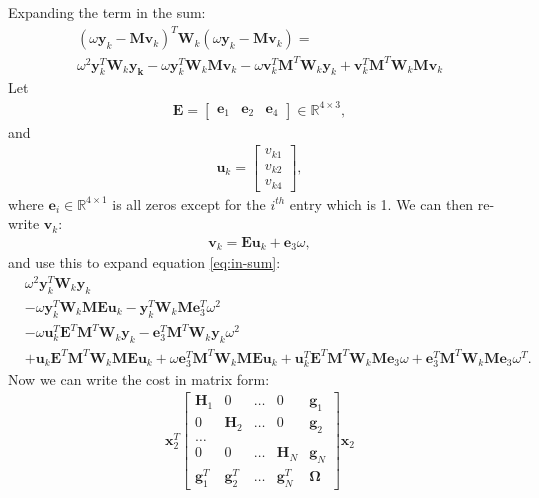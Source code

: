 \documentclass{article}
\begin{document}
Expanding the term in the sum:
\begin{align}
(\omega\mathbf{y}_k - \mathbf{M} \mathbf{v}_k)^T \mathbf{W}_k (\omega \mathbf{y}_k - \mathbf{M} \mathbf{v}_k) = \\
\omega^2 \mathbf{y}_k^T \mathbf{W}_k \mathbf{y_k} - \omega\mathbf{y}_k^T \mathbf{W}_k \mathbf{M} \mathbf{v}_k - \omega  \mathbf{v}_k^T\mathbf{M}^T\mathbf{W}_k \mathbf{y}_k + \mathbf{v}_k^T\mathbf{M}^T\mathbf{W}_k \mathbf{M} \mathbf{v}_k \label{eq:in-sum}
\end{align}
Let
\begin{align}
    \mathbf{E} = \begin{bmatrix}
        \mathbf{e}_1 & \mathbf{e}_2 & \mathbf{e}_4
    \end{bmatrix} \in \mathbb{R}^{4 \times 3},
\end{align}
and
\begin{align}
    \mathbf{u}_k = \begin{bmatrix}
        v_{k1} \\
        v_{k2} \\
        v_{k4}
    \end{bmatrix},
\end{align}
where $\mathbf{e}_i \in \mathbb{R}^{4\times 1}$ is all zeros except for the $i^{th}$ entry which is 1.
We can then re-write $\mathbf{v}_k$:
\begin{align}
    \mathbf{v}_k = \mathbf{E}\mathbf{u}_k + \mathbf{e}_3 \omega,
\end{align}
and use this to expand equation \ref{eq:in-sum}:
\begin{align}
    &\omega^2 \mathbf{y}_k^T \mathbf{W}_k \mathbf{y}_k \\
    &- \omega \mathbf{y}_k^T \mathbf{W}_k \mathbf{M} \mathbf{E} \mathbf{u}_k - \mathbf{y}_k^T \mathbf{W}_k \mathbf{M} \mathbf{e}_3^T \omega^2 \\
    &- \omega \mathbf{u}_k^T \mathbf{E}^T \mathbf{M}^T \mathbf{W}_k \mathbf{y}_k - \mathbf{e}_3^T \mathbf{M}^T \mathbf{W}_k \mathbf{y}_k \omega^2 \\
    &+ \mathbf{u}_k \mathbf{E}^T \mathbf{M}^T \mathbf{W}_k \mathbf{M} \mathbf{E} \mathbf{u}_k + \omega \mathbf{e}_3^T \mathbf{M}^T \mathbf{W}_k \mathbf{M} \mathbf{E} \mathbf{u}_k + \mathbf{u}_k^T \mathbf{E}^T \mathbf{M}^T \mathbf{W}_k \mathbf{M} \mathbf{e}_3 \omega + \mathbf{e}_3^T \mathbf{M}^T \mathbf{W}_k \mathbf{M} \mathbf{e}_3 \omega^T.
\end{align}
Now we can write the cost in matrix form:
\begin{align}
    \mathbf{x}_2^T
    \begin{bmatrix}
        \mathbf{H}_1 & 0 & \dots & 0 & \mathbf{g}_1 \\
        0 & \mathbf{H}_2 & \dots & 0 & \mathbf{g}_2 \\
        \dots \\
        0 & 0 & \dots & \mathbf{H}_N & \mathbf{g}_N \\ 
        \mathbf{g}_1^T & \mathbf{g}_2^T & \dots &  \mathbf{g}_N^T & \mathbf{\Omega}
    \end{bmatrix}  
    \mathbf{x}_2
\end{align}
\end{document}
